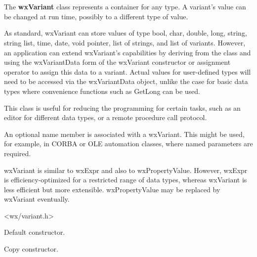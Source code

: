 \section{}\label{wxvariant}

The {\bf wxVariant} class represents a container for any type.
A variant's value can be changed at run time, possibly to a different type of value.

As standard, wxVariant can store values of type bool, char, double, long, string,
string list, time, date, void pointer, list of strings, and list of variants. However, an application can extend
wxVariant's capabilities by deriving from the class  and
using the wxVariantData form of the wxVariant constructor or assignment operator
to assign this data to a variant. Actual values for user-defined types will need to be accessed
via the wxVariantData object, unlike the case for basic data types where convenience
functions such as GetLong can be used.

This class is useful for reducing the programming for certain tasks, such as an editor
for different data types, or a remote procedure call protocol.

An optional name member is associated with a wxVariant. This might be used, for example, in CORBA
or OLE automation classes, where named parameters are required.

wxVariant is similar to wxExpr and also to wxPropertyValue. However, wxExpr is efficiency-optimized for
a restricted range of data types, whereas wxVariant is less efficient but more extensible.
wxPropertyValue may be replaced by wxVariant eventually.




<wx/variant.h>




\label{wxvariantctor}


Default constructor.


Copy constructor.

